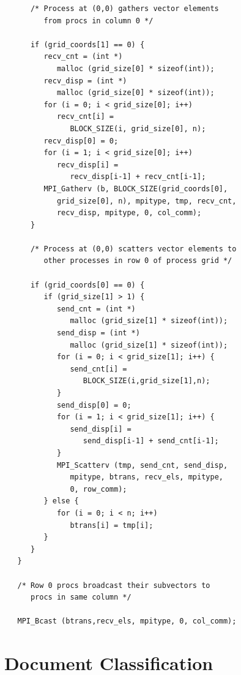 \begin{enumerate}
\begin{enumerate}
\begin{verbatim}
      /* Process at (0,0) gathers vector elements
         from procs in column 0 */

      if (grid_coords[1] == 0) {
         recv_cnt = (int *)
            malloc (grid_size[0] * sizeof(int));
         recv_disp = (int *)
            malloc (grid_size[0] * sizeof(int));
         for (i = 0; i < grid_size[0]; i++)
            recv_cnt[i] =
               BLOCK_SIZE(i, grid_size[0], n);
         recv_disp[0] = 0;
         for (i = 1; i < grid_size[0]; i++)
            recv_disp[i] =
               recv_disp[i-1] + recv_cnt[i-1];
         MPI_Gatherv (b, BLOCK_SIZE(grid_coords[0],
            grid_size[0], n), mpitype, tmp, recv_cnt,
            recv_disp, mpitype, 0, col_comm);
      }

      /* Process at (0,0) scatters vector elements to
         other processes in row 0 of process grid */

      if (grid_coords[0] == 0) {
         if (grid_size[1] > 1) {
            send_cnt = (int *)
               malloc (grid_size[1] * sizeof(int));
            send_disp = (int *)
               malloc (grid_size[1] * sizeof(int));
            for (i = 0; i < grid_size[1]; i++) {
               send_cnt[i] =
                  BLOCK_SIZE(i,grid_size[1],n);
            }
            send_disp[0] = 0;
            for (i = 1; i < grid_size[1]; i++) {
               send_disp[i] =
                  send_disp[i-1] + send_cnt[i-1];
            } 
            MPI_Scatterv (tmp, send_cnt, send_disp,
               mpitype, btrans, recv_els, mpitype,
               0, row_comm);
         } else {
            for (i = 0; i < n; i++)
               btrans[i] = tmp[i];
         }
      }
   }

   /* Row 0 procs broadcast their subvectors to
      procs in same column */

   MPI_Bcast (btrans,recv_els, mpitype, 0, col_comm);
\end{verbatim}
\end{enumerate}

\end{enumerate}

\chapter{Document Classification}


